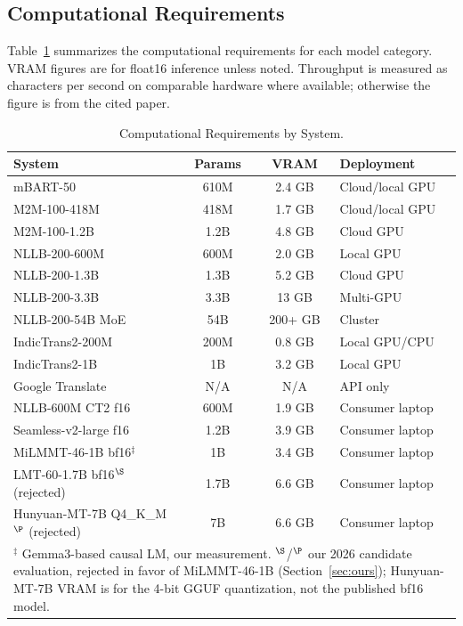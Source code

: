 \documentclass[conference]{IEEEtran}
\begin{document}
\subsection{Computational Requirements}

Table~\ref{tab:compute} summarizes the computational requirements for
each model category.
VRAM figures are for float16 inference unless noted.
Throughput is measured as characters per second on comparable hardware
where available; otherwise the figure is from the cited paper.

\begin{table}[t]
  \centering
  \caption{Computational Requirements by System.}
  \label{tab:compute}
  \small
  \setlength{\tabcolsep}{3pt}
  \begin{tabular}{p{3.0cm} c c p{1.8cm}}
    \toprule
    \textbf{System} & \textbf{Params} & \textbf{VRAM} & \textbf{Deployment} \\
    \midrule
    mBART-50         & 610M  & 2.4 GB & Cloud/local GPU \\
    M2M-100-418M     & 418M  & 1.7 GB & Cloud/local GPU \\
    M2M-100-1.2B     & 1.2B  & 4.8 GB & Cloud GPU       \\
    NLLB-200-600M    & 600M  & 2.0 GB & Local GPU       \\
    NLLB-200-1.3B    & 1.3B  & 5.2 GB & Cloud GPU       \\
    NLLB-200-3.3B    & 3.3B  & 13 GB  & Multi-GPU       \\
    NLLB-200-54B MoE & 54B   & 200+ GB& Cluster         \\
    IndicTrans2-200M & 200M  & 0.8 GB & Local GPU/CPU   \\
    IndicTrans2-1B   & 1B    & 3.2 GB & Local GPU       \\
    Google Translate & N/A   & N/A    & API only        \\
    NLLB-600M CT2 f16& 600M  & 1.9 GB & Consumer laptop \\
    Seamless-v2-large f16 & 1.2B & 3.9 GB & Consumer laptop \\
    MiLMMT-46-1B bf16$^\ddagger$ & 1B & 3.4 GB & Consumer laptop \\
    LMT-60-1.7B bf16$^\S$ (rejected) & 1.7B & 6.6 GB & Consumer laptop \\
    Hunyuan-MT-7B Q4\_K\_M$^\P$ (rejected) & 7B & 6.6 GB & Consumer laptop \\
    \bottomrule
    \multicolumn{4}{p{8.4cm}}{\scriptsize $^\ddagger$ Gemma3-based causal LM, our
      measurement. $^\S$/$^\P$ our 2026 candidate evaluation, rejected in favor
      of MiLMMT-46-1B (Section~\ref{sec:ours}); Hunyuan-MT-7B VRAM is for the
      4-bit GGUF quantization, not the published bf16 model.}
  \end{tabular}
\end{table}
\end{document}
